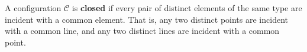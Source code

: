 A configuration $\mathcal{C}$ is \textbf{closed} if every pair of distinct elements of the same type are incident with a common element. That is, any two distinct points are incident with a common line, and any two distinct lines are incident with a common point.
